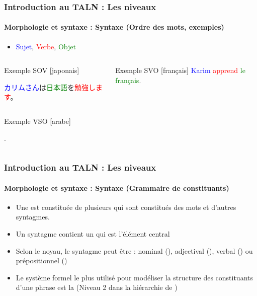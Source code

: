 \documentclass[xcolor=table]{beamer}
\begin{document}
\begin{frame}
\frametitle{Introduction au TALN : Les niveaux}
\framesubtitle{Morphologie et syntaxe : Syntaxe (Ordre des mots, exemples)}

\begin{itemize}
	\item \textcolor{blue}{Sujet}, \textcolor{red}{Verbe}, \textcolor{green}{Objet}
\end{itemize}

\begin{columns}
\begin{column}{0.52\textwidth}
	\begin{exampleblock}{Exemple SOV [japonais]}
		\begin{CJK}{UTF8}{min}
			\textcolor{blue}{カリムさん}は\textcolor{green}{日本語}を\textcolor{red}{勉強します}。
		\end{CJK}
	\end{exampleblock}
\end{column}
%
\begin{column}{0.42\textwidth}
	\begin{exampleblock}{Exemple SVO [français]}
		\textcolor{blue}{Karim} \textcolor{red}{apprend} \textcolor{green}{le français}.
	\end{exampleblock}
\end{column}%
\end{columns}
\begin{columns}
\begin{column}{0.49\textwidth}
	\begin{exampleblock}{Exemple VSO [arabe]}
		\begin{RLtext}
			  
			  
			.
		\end{RLtext}
	\end{exampleblock}
\end{column}
\end{columns}

\end{frame}

\begin{frame}
\frametitle{Introduction au TALN : Les niveaux}
\framesubtitle{Morphologie et syntaxe : Syntaxe (Grammaire de constituants)}

\begin{itemize}
	\item Une  est constituée de plusieurs  qui sont constitués des mots et d'autres syntagmes.
	\item Un syntagme contient un  qui est l'élément central 
	\item Selon le noyau, le syntagme peut être : nominal (), adjectival (), verbal () ou prépositionnel ()
	\item Le système formel le plus utilisé pour modéliser la structure des constituants d'une phrase est la  (Niveau 2 dans la hiérarchie de )
\end{itemize}


\end{frame}
\end{document}
